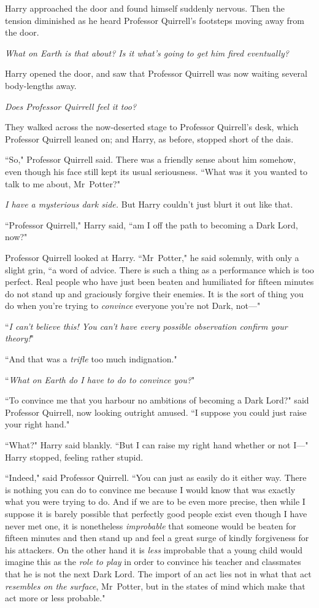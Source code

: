 Harry approached the door and found himself suddenly nervous. Then the tension diminished as he heard Professor Quirrell's footsteps moving away from the door.

\emph{What on Earth is that about? Is it what's going to get him fired eventually?}

Harry opened the door, and saw that Professor Quirrell was now waiting several body-lengths away.

\emph{Does Professor Quirrell feel it too?}

They walked across the now-deserted stage to Professor Quirrell's desk, which Professor Quirrell leaned on; and Harry, as before, stopped short of the dais.

``So," Professor Quirrell said. There was a friendly sense about him somehow, even though his face still kept its usual seriousness. ``What was it you wanted to talk to me about, Mr~Potter?"

\emph{I have a mysterious dark side.} But Harry couldn't just blurt it out like that.

``Professor Quirrell," Harry said, ``am I off the path to becoming a Dark Lord, now?"

Professor Quirrell looked at Harry. ``Mr~Potter," he said solemnly, with only a slight grin, ``a word of advice. There is such a thing as a performance which is too perfect. Real people who have just been beaten and humiliated for fifteen minutes do not stand up and graciously forgive their enemies. It is the sort of thing you do when you're trying to \emph{convince} everyone you're not Dark, not—"

``\emph{I can't believe this! You can't have every possible observation confirm your theory!}"

``And that was a \emph{trifle} too much indignation."

``\emph{What on Earth do I have to do to convince you?}"

``To convince me that you harbour no ambitions of becoming a Dark Lord?" said Professor Quirrell, now looking outright amused. ``I suppose you could just raise your right hand."

``What?" Harry said blankly. ``But I can raise my right hand whether or not I—" Harry stopped, feeling rather stupid.

``Indeed," said Professor Quirrell. ``You can just as easily do it either way. There is nothing you can do to convince me because I would know that was exactly what you were trying to do. And if we are to be even more precise, then while I suppose it is barely possible that perfectly good people exist even though I have never met one, it is nonetheless \emph{improbable} that someone would be beaten for fifteen minutes and then stand up and feel a great surge of kindly forgiveness for his attackers. On the other hand it is \emph{less} improbable that a young child would imagine this as the \emph{role to play} in order to convince his teacher and classmates that he is not the next Dark Lord. The import of an act lies not in what that act \emph{resembles on the surface}, Mr~Potter, but in the states of mind which make that act more or less probable."

